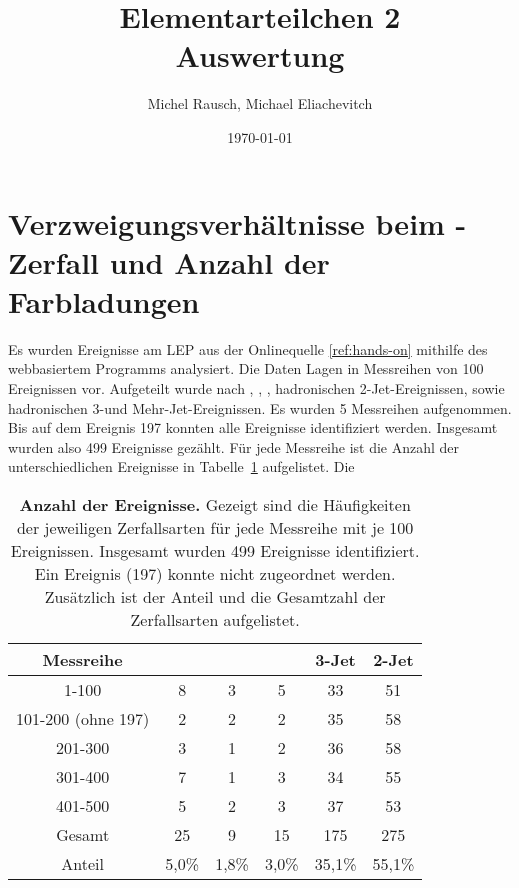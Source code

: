 \documentclass[a4paper,ngerman]{scrartcl}
\title{Elementarteilchen 2\\Auswertung}
\date{\today}
\author{Michel Rausch, Michael Eliachevitch}
\begin{document}
\maketitle
\tableofcontents
\newpage


\section{Verzweigungsverhältnisse beim \PZzero-Zerfall und Anzahl der Farbladungen}
\label{sec:verzweigungen}

Es wurden Ereignisse am LEP aus der Onlinequelle \ref{ref:hands-on} mithilfe des webbasiertem Programms analysiert.
Die Daten Lagen in Messreihen von 100 Ereignissen vor.
Aufgeteilt wurde nach \Pelectron\APelectron ,	\Ptauon\APtauon	,	\Pmuon\APmuon , hadronischen 2-Jet-Ereignissen, sowie hadronischen 3-und Mehr-Jet-Ereignissen.
Es wurden 5 Messreihen aufgenommen. 
Bis auf dem Ereignis 197 konnten alle Ereignisse identifiziert werden.
Insgesamt wurden also 499 Ereignisse gezählt.
Für jede Messreihe ist die Anzahl der unterschiedlichen Ereignisse in Tabelle~\ref{tab:count} aufgelistet.
Die 

\begin{table}
\centering
\caption{\textbf{Anzahl der Ereignisse.} 
Gezeigt sind die Häufigkeiten der jeweiligen Zerfallsarten für jede Messreihe mit je 100 Ereignissen. 
Insgesamt wurden 499 Ereignisse identifiziert.
Ein Ereignis (197) konnte nicht zugeordnet werden.
Zusätzlich ist der Anteil und die Gesamtzahl der Zerfallsarten aufgelistet.
}
\begin{tabular}{cccccc}
\toprule
Messreihe			&	\Pelectron\APelectron	&	\Ptauon\APtauon	&	\Pmuon\APmuon	&	3-Jet	&	2-Jet	\\
\midrule
1-100				& 	8	&	3	&	5	&	33	&	51	\\
101-200 (ohne 197)	& 	2	&	2	&	2	&	35	&	58	\\
201-300				&	3	&	1	&	2	&	36	&	58	\\
301-400				&	7	&	1	&	3	&	34	&	55	\\
401-500				&	5	&	2	&	3	&	37	&	53	\\
Gesamt				&	25	&	9	&	15	&	175	&	275	\\
Anteil				&5,0\%	&1,8\%  &3,0\%	&35,1\%	&55,1\%	\\
\bottomrule
\end{tabular}
\label{tab:count}
\end{table}
\end{document}
